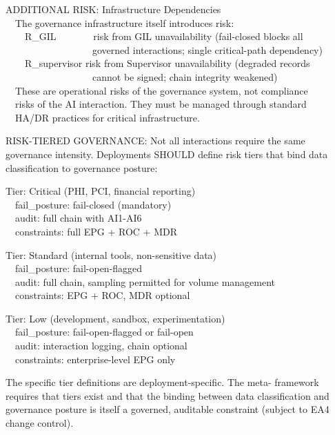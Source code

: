\begin{cdef}
\begin{claddisp}
ADDITIONAL RISK: Infrastructure Dependencies\\
~~The governance infrastructure itself introduces risk:\\
~~~~R\_GIL~~~~~~~\textemdash{} risk from GIL unavailability (fail-closed blocks all\\
~~~~~~~~~~~~~~~~~~governed interactions; single critical-path dependency)\\
~~~~R\_supervisor \textemdash{} risk from Supervisor unavailability (degraded records\\
~~~~~~~~~~~~~~~~~~cannot be signed; chain integrity weakened)\\
~~These are operational risks of the governance system, not compliance\\
~~risks of the AI interaction. They must be managed through standard\\
~~HA/DR practices for critical infrastructure.\\
\end{claddisp}
RISK-TIERED GOVERNANCE: Not all interactions require the same governance intensity. Deployments SHOULD define risk tiers that bind data classification to governance posture:

\begin{claddisp}
Tier: Critical (PHI, PCI, financial reporting)\\
~~fail\_posture: fail-closed (mandatory)\\
~~audit: full chain with AI1-AI6\\
~~constraints: full EPG + ROC + MDR\\
\end{claddisp}
\begin{claddisp}
Tier: Standard (internal tools, non-sensitive data)\\
~~fail\_posture: fail-open-flagged\\
~~audit: full chain, sampling permitted for volume management\\
~~constraints: EPG + ROC, MDR optional\\
\end{claddisp}
\begin{claddisp}
Tier: Low (development, sandbox, experimentation)\\
~~fail\_posture: fail-open-flagged or fail-open\\
~~audit: interaction logging, chain optional\\
~~constraints: enterprise-level EPG only\\
\end{claddisp}
The specific tier definitions are deployment-specific. The meta- framework requires that tiers exist and that the binding between data classification and governance posture is itself a governed, auditable constraint (subject to EA4 change control).

\end{cdef}


